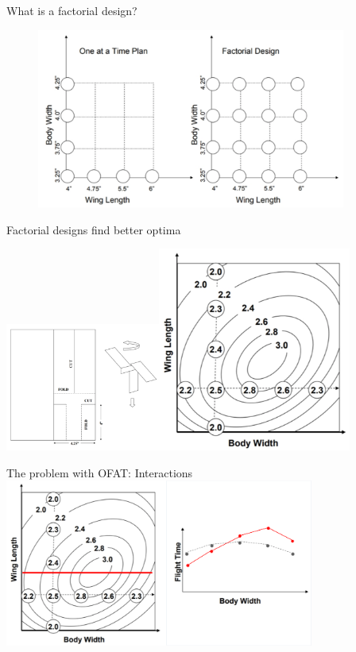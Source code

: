 \documentclass[10pt]{beamer}
\begin{document}
\begin{frame}{What is a factorial design?}

\begin{figure}
\centering
\includegraphics[width=4in]{figures/factorial1.png}
\end{figure}

\end{frame}

\begin{frame}{Factorial designs find better optima}

\includegraphics[width=2in]{figures/factorial2-1.png}\includegraphics[width=2.5in]{figures/factorial2-3.png}

\end{frame}

\begin{frame}{The problem with OFAT: Interactions}
\centering
\includegraphics[width=4in]{figures/factorial5.png}

\end{frame}
\end{document}
